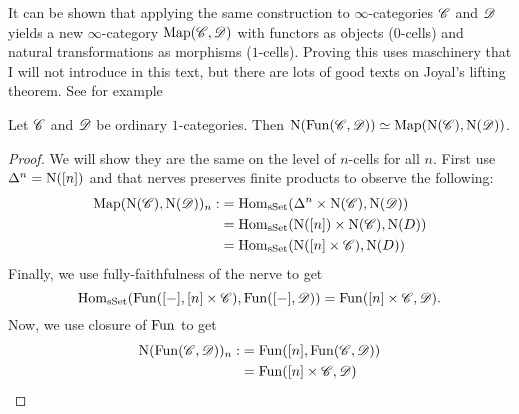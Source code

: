 \documentclass[../../thesis.tex]{subfiles}
\begin{document}
It can be shown that applying the same construction to $\infty$-categories $\mathscr{C}$ and $\mathscr{D}$ yields a new $\infty$-category $\mathrm{Map}(\mathscr{C}, \mathscr{D})$ with functors as objects ($0$-cells) and natural transformations as morphisms ($1$-cells).
Proving this uses maschinery that I will not introduce in this text, but there are lots of good texts on Joyal's lifting theorem.
See for example 
\begin{example}
    Let $\mathscr{C}$ and $\mathscr{D}$ be ordinary $1$-categories.
    Then $\mathrm{N}(\mathrm{Fun}(\mathscr{C}, \mathscr{D})) \simeq \mathrm{Map}(\mathrm{N}(\mathscr{C}), \mathrm{N}(\mathscr{D}))$.
\end{example}
\begin{proof}
    We will show they are the same on the level of $n$-cells for all $n$.
    First use $\Delta^n = \mathrm{N}([n])$ and that nerves preserves finite products to observe the following:
    \begin{align}
        \mathrm{Map}(\mathrm{N}(\mathscr{C}), \mathrm{N}(\mathscr{D}))_n: & = \mathrm{Hom}_{\mathrm{sSet}}(\Delta^n \times \mathrm{N}(\mathscr{C}), \mathrm{N}(\mathscr{D}))  \\
                                        & = \mathrm{Hom}_{\mathrm{sSet}}(\mathrm{N}([n])\times \mathrm{N}(\mathscr{C}), \mathrm{N}(D)) \\
                                        & = \mathrm{Hom}_{\mathrm{sSet}}(\mathrm{N}([n]\times \mathscr{C}), \mathrm{N}(D))
    \end{align}
    Finally, we use fully-faithfulness of the nerve to get
    \[
        \mathrm{Hom}_{\mathrm{sSet}}(\mathrm{Fun}([-], [n]\times \mathscr{C}) , \mathrm{Fun}([-], \mathscr{D})) = \mathrm{Fun}([n]\times \mathscr{C}, \mathscr{D}).
    \]
    Now, we use closure of $\mathrm{Fun}$ to get
    \begin{align}
        \mathrm{N}(\mathrm{Fun}(\mathscr{C}, \mathscr{D}))_n: & = \mathrm{Fun}([n], \mathrm{Fun}(\mathscr{C}, \mathscr{D})) \\
                                & = \mathrm{Fun}([n]\times \mathscr{C}, \mathscr{D})
    \end{align}
\end{proof}
\end{document}

